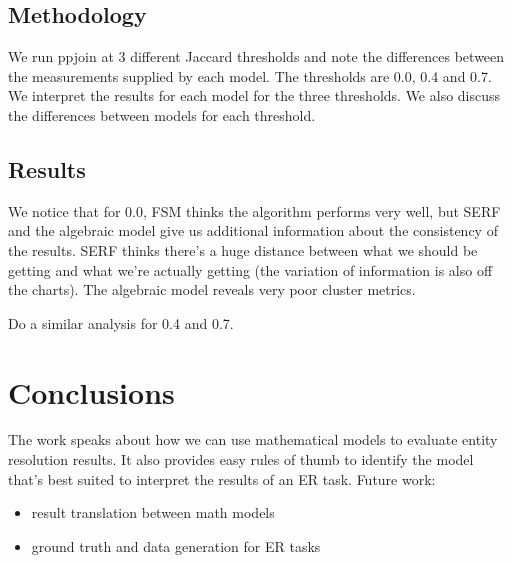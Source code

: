 \documentclass[11pt]{article}
\begin{document}
    \subsection[method]{Methodology}
    We run ppjoin at 3 different Jaccard thresholds and note the differences between the measurements supplied by each
    model.
    The thresholds are 0.0, 0.4 and 0.7.
    We interpret the results for each model for the three thresholds.
    We also discuss the differences between models for each threshold.

    \subsection[results]{Results}
    We notice that for 0.0, FSM thinks the algorithm performs very well, but SERF and the algebraic model give us
    additional information about the consistency of the results.
    SERF thinks there's a huge distance between what we should be getting and what we're actually getting (the variation
    of information is also off the charts).
    The algebraic model reveals very poor cluster metrics.

    Do a similar analysis for 0.4 and 0.7.

    \section[conclusion]{Conclusions}
    The work speaks about how we can use mathematical models to evaluate entity resolution results. It also provides
    easy rules of thumb to identify the model that's best suited to interpret the results of an ER task.
    Future work:
    \begin{itemize}
        \item result translation between math models
        \item ground truth and data generation for ER tasks
    \end{itemize}
\end{document}
